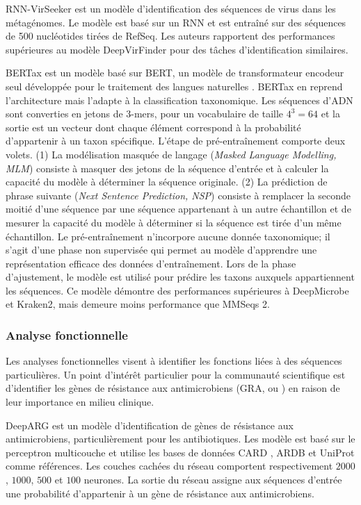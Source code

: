 RNN-VirSeeker \cite{liu2022} est un modèle d'identification des séquences de virus dans les
métagénomes. Le modèle est basé sur un RNN et est entraîné sur des séquences de 500 nucléotides
tirées de RefSeq. Les auteurs rapportent des performances supérieures au modèle DeepVirFinder pour
des tâches d'identification similaires.

BERTax \cite{mock2022} est un modèle basé sur BERT, un modèle de transformateur encodeur seul
développée pour le traitement des langues naturelles \cite{devlin2019}. BERTax en reprend
l'architecture mais l'adapte à la classification taxonomique. Les séquences d'ADN sont converties en
jetons de 3-mers, pour un vocabulaire de taille $4^3 = 64$ et la sortie est un vecteur dont chaque
élément correspond à la probabilité d'appartenir à un taxon spécifique. L'étape de pré-entraînement
comporte deux volets. (1) La modélisation masquée de langage (\textit{Masked Language Modelling,
MLM}) consiste à masquer des jetons de la séquence d'entrée et à calculer la capacité du modèle à
déterminer la séquence originale. (2) La prédiction de phrase suivante (\textit{Next Sentence
Prediction, NSP}) consiste à remplacer la seconde moitié d'une séquence par une séquence appartenant
à un autre échantillon et de mesurer la capacité du modèle à déterminer si la séquence est tirée
d'un même échantillon. Le pré-entraînement n'incorpore aucune donnée taxonomique; il s'agit d'une
phase non supervisée qui permet au modèle d'apprendre une représentation efficace des données
d'entraînement. Lors de la phase d'ajustement, le modèle est utilisé pour prédire les taxons
auxquels appartiennent les séquences. Ce modèle démontre des performances supérieures à DeepMicrobe
et Kraken2, mais demeure moins performance que MMSeqs 2.

\subsubsection{Analyse fonctionnelle}

Les analyses fonctionnelles visent à identifier les fonctions liées à des séquences particulières.
Un point d'intérêt particulier pour la communauté scientifique est d'identifier les gènes de
résistance aux antimicrobiens (GRA, ou ) en raison de leur
importance en milieu clinique.

DeepARG \cite{arango2018} est un modèle d'identification de gènes de résistance aux antimicrobiens,
particulièrement pour les antibiotiques. Les modèle est basé sur le perceptron multicouche et
utilise les bases de données CARD \cite{alcock2023}, ARDB \cite{liu2009} et UniProt \cite{uniprot}
comme références. Les couches cachées du réseau comportent respectivement $2000$, $1000$, $500$ et
$100$ neurones. La sortie du réseau assigne aux séquences d'entrée une probabilité d'appartenir à
un gène de résistance aux antimicrobiens.

